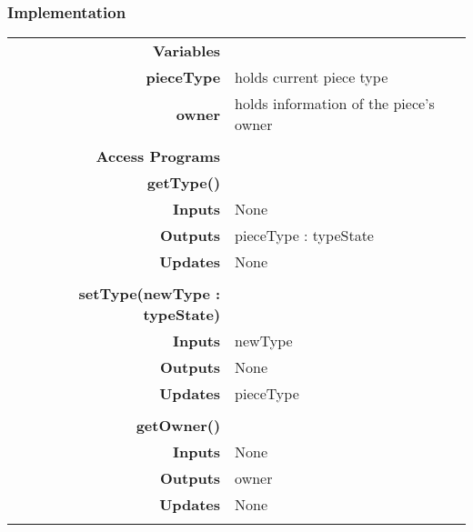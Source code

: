 \documentclass[10pt]{article}
\begin{document}
    \subsubsection{Implementation}
        \begin{tabularx}{\linewidth}{ >{\bfseries}r Xp{5cm} }
            Variables       & \begin{tabular}[t]{@{} l p{8cm}} 
                                     & \\
                                    pieceType & holds current piece type \\
                                    owner & holds information of the piece's owner \\
                              \end{tabular} \\

            Access Programs & \begin{tabular}[t]{@{} l l p{8cm}} 
                                     & \\
                                    \bf{getType()} & \\
                                    Inputs &  None \\
                                    Outputs & pieceType : typeState \\
                                    Updates & None \\ 
                                     & \\
                                    \bf{setType(newType : typeState)} & \\
                                    Inputs & newType \\
                                    Outputs & None \\
                                    Updates & pieceType \\ 
                                     & \\
                                    \bf{getOwner()} & \\
                                    Inputs & None \\
                                    Outputs & owner \\
                                    Updates & None \\ 
                              \end{tabular} \\
                              
        \end{tabularx}
        
\end{document}
